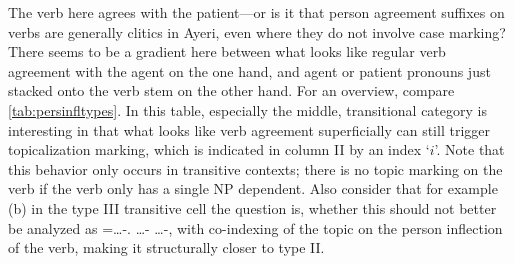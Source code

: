 The verb here agrees with the patient---or is it that person agreement suffixes
on verbs are generally clitics in Ayeri, even where they do not involve case
marking? There seems to be a gradient here between what looks like regular verb
agreement with the agent on the one hand, and agent or patient pronouns just
stacked onto the verb stem on the other hand. For an overview, compare
\autoref{tab:persinfltypes}. In this table, especially the middle,
transitional category is interesting in that what looks like verb agreement
superficially can still trigger topicalization marking, which is indicated in
column II by an index `$i$'. Note that this behavior only occurs in transitive
contexts; there is no topic marking on the verb if the verb only has a single
NP dependent. Also consider that for example (b) in the type III transitive
cell the question is, whether this should not better be analyzed as
\AgtT{}=…-\TsgM{}.\Top{} …-\Top{} …-\Parg{}, with co-indexing of the topic on 
the person inflection of the verb, making it structurally closer to type II.

